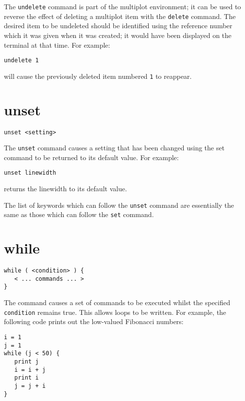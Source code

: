 The {\tt undelete} command is part of the multiplot environment; it can be used
to reverse the effect of deleting a multiplot item with the {\tt delete}
command. The desired item to be undeleted should be identified using the
reference number which it was given when it was created; it would have been
displayed on the terminal at that time. For example:

\begin{verbatim}
undelete 1
\end{verbatim}

\noindent will cause the previously deleted item numbered {\tt 1} to reappear.


\section{unset}

\begin{verbatim}
unset <setting>
\end{verbatim}

The {\tt unset} command causes a setting that has been changed using the set
command to be returned to its default value.  For example:

\begin{verbatim}
unset linewidth
\end{verbatim}

\noindent returns the linewidth to its default value.

The list of keywords which can follow the {\tt unset} command are essentially
the same as those which can follow the {\tt set} command.


\section{while}

\begin{verbatim}
while ( <condition> ) {
   < ... commands ... >
}
\end{verbatim}

The  command causes a set of commands to be executed whilst the
specified {\tt condition} remains true.  This allows loops to be written.  For
example, the following code prints out the low-valued Fibonacci numbers:

\begin{verbatim}
i = 1
j = 1
while (j < 50) {
   print j
   i = i + j
   print i
   j = j + i
}
\end{verbatim}
